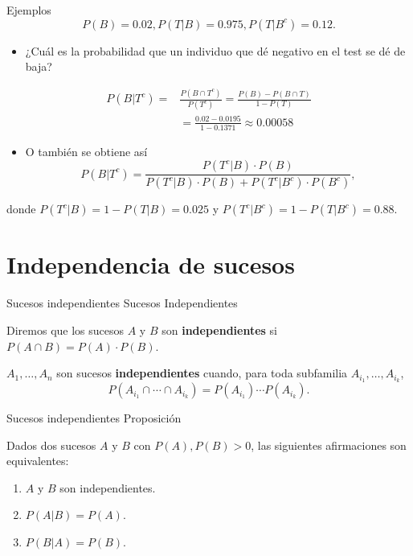 \documentclass[
  ignorenonframetext,
  aspectratio=169]{beamer}
\providecommand{\tightlist}{%
  \setlength{\itemsep}{0pt}\setlength{\parskip}{0pt}}\usepackage{longtable,booktabs,array}
\begin{document}
\begin{frame}{Ejemplos}
\label{ejemplos-10}
\[P(B)=0.02, P(T|B)=0.975, P(T|B^c)=0.12.\]

\begin{itemize}
\tightlist
\item
  ¿Cuál es la probabilidad que un individuo que dé negativo en el test
  se dé de baja?
\end{itemize}

\[
\begin{array}{rl}
P(B|T^c)= &\displaystyle \frac{P(B\cap T^c)}{P(T^c)}=
\frac{P(B)-P(B\cap T)}{1-P(T)}\\[2ex] & \displaystyle =
\frac{0.02-0.0195}{1-0.1371}\approx 0.00058
\end{array}
\]

\begin{itemize}
\tightlist
\item
  O también se obtiene así \[
  P(B|T^c)=\frac{P(T^c|B)\cdot P(B)}{P(T^c|B)\cdot P(B)+P(T^c|B^c)\cdot P(B^c)},
  \]
\end{itemize}

donde \(P(T^c|B)=1-P(T|B)=0.025\) y \(P(T^c|B^c)=1-P(T|B^c)=0.88.\)
\end{frame}

\section{Independencia de sucesos}\label{independencia-de-sucesos}

\begin{frame}{Sucesos independientes}
\label{sucesos-independientes}
Sucesos Independientes

Diremos que los sucesos \(A\) y \(B\) son \textbf{independientes} si
\(P(A\cap B)=P(A)\cdot P(B)\).

\(A_1,\ldots, A_n\) son sucesos \textbf{independientes} cuando, para
toda subfamilia \(A_{i_1},\ldots,A_{i_k}\), \[
P(A_{i_1}\cap \cdots\cap A_{i_k})=P(A_{i_1})\cdots P(A_{i_k}).
\]
\end{frame}

\begin{frame}{Sucesos independientes}
\label{sucesos-independientes-1}
Proposición

Dados dos sucesos \(A\) y \(B\) con \(P(A),P(B)>0\), las siguientes
afirmaciones son equivalentes:

\begin{enumerate}
\tightlist
\item
  \(A\) y \(B\) son independientes.
\item
  \(P(A|B)=P(A)\).
\item
  \(P(B|A)=P(B)\).
\end{enumerate}
\end{frame}
\end{document}
